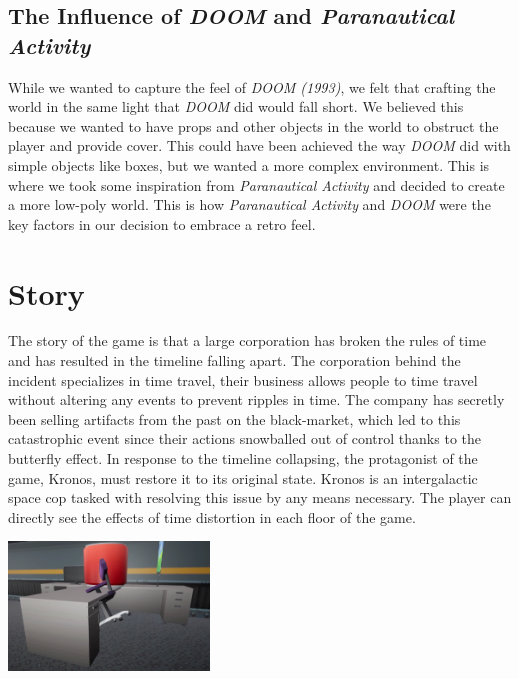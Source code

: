 \documentclass{sigchi}
\begin{document}
\subsection{The Influence of \textit{DOOM} and \textit{Paranautical Activity}}
While we wanted to capture the feel of \textit{DOOM (1993)}, we felt that crafting the world in the same light that \textit{DOOM} did would fall short. We believed this because we wanted to have props and other objects in the world to obstruct the player and provide cover. This could have been achieved the way \textit{DOOM} did with simple objects like boxes, but we wanted a more complex environment. This is where we took some inspiration from \textit{Paranautical Activity} and decided to create a more low-poly world. This is how \textit{Paranautical Activity} and \textit{DOOM} were the key factors in our decision to embrace a retro feel.

\section{Story}
The story of the game is that a large corporation has broken the rules of time and has resulted in the timeline falling apart. The corporation behind the incident specializes in time travel, their business allows people to time travel without altering any events to prevent ripples in time. The company has secretly been selling artifacts from the past on the black-market, which led to this catastrophic event since their actions snowballed out of control thanks to the butterfly effect. In response to the timeline collapsing, the protagonist of the game, Kronos, must restore it to its original state. Kronos is an intergalactic space cop tasked with resolving this issue by any means necessary. The player can directly see the effects of time distortion in each floor of the game.
\begin{center}
    \includegraphics[width=0.4\textwidth]{timeMessedUp.png}
    \label{fig:time-dist}
\end{center}
\end{document}
